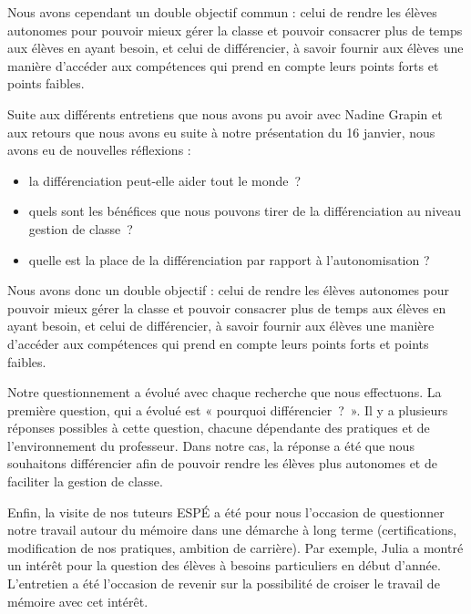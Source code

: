   Nous avons cependant un double objectif commun : celui de rendre les élèves autonomes pour pouvoir mieux gérer la classe et pouvoir consacrer plus de temps aux élèves en ayant besoin, et celui de différencier, à savoir fournir aux élèves une manière d’accéder aux compétences qui prend en compte leurs points forts et points faibles.

  Suite aux différents entretiens que nous avons pu avoir avec Nadine Grapin et aux retours que nous avons eu suite à notre présentation du 16 janvier, nous avons eu de nouvelles réflexions :
  \begin{itemize}
      \item la différenciation peut-elle aider tout le monde ?
      \item quels sont les bénéfices que nous pouvons tirer de la différenciation au niveau gestion de classe ?
      \item quelle est la place de la différenciation par rapport à l’autonomisation ?
  \end{itemize}


 Nous avons donc un double objectif : celui de rendre les élèves autonomes pour pouvoir mieux gérer la classe et pouvoir consacrer plus de temps aux élèves en ayant besoin, et celui de différencier, à savoir fournir aux élèves une manière d’accéder aux compétences qui prend en compte leurs points forts et points faibles.

Notre questionnement a évolué avec chaque recherche que nous effectuons. La première question, qui a évolué est « pourquoi différencier ? ». Il y a plusieurs réponses possibles à cette question, chacune dépendante des pratiques et de l’environnement du professeur. Dans notre cas, la réponse a été que nous souhaitons différencier afin de pouvoir rendre les élèves plus autonomes et de faciliter la gestion de classe.

Enfin, la visite de nos tuteurs ESPÉ a été pour nous l’occasion de questionner notre travail autour du mémoire dans une démarche à long terme (certifications, modification de nos pratiques, ambition de carrière). Par exemple, Julia a montré un intérêt pour la question des élèves à besoins particuliers en début d’année. L’entretien a été l’occasion de revenir sur la possibilité de croiser le travail de mémoire avec cet intérêt.

